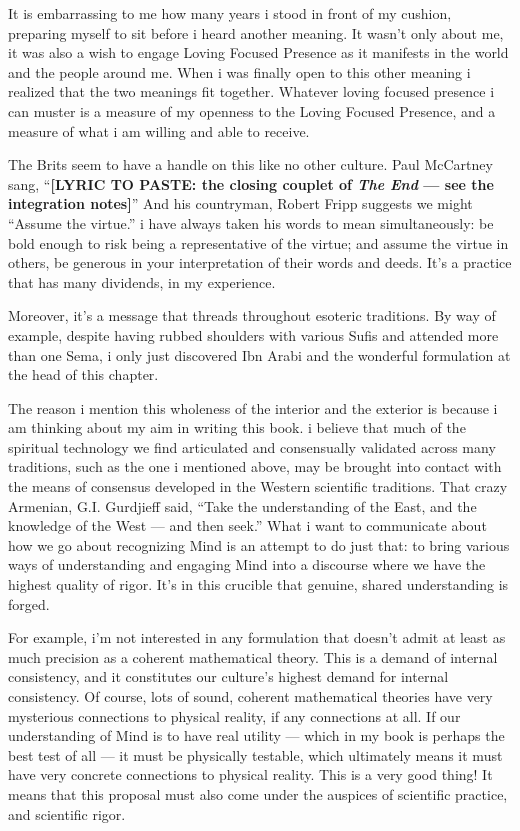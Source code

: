 It is embarrassing to me how many years i stood in front of my cushion, preparing myself to sit before i heard another meaning. It wasn't only about me, it was also a wish to engage Loving Focused Presence as it manifests in the world and the people around me. When i was finally open to this other meaning i realized that the two meanings fit together. Whatever loving focused presence i can muster is a measure of my openness to the Loving Focused Presence, and a measure of what i am willing and able to receive.

The Brits seem to have a handle on this like no other culture. Paul McCartney sang, ``\textbf{[LYRIC TO PASTE: the closing couplet of \emph{The End} --- see the integration notes]}'' And his countryman, Robert Fripp suggests we might ``Assume the virtue.'' i have always taken his words to mean simultaneously: be bold enough to risk being a representative of the virtue; and assume the virtue in others, be generous in your interpretation of their words and deeds. It's a practice that has many dividends, in my experience.

Moreover, it's a message that threads throughout esoteric traditions. By way of example, despite having rubbed shoulders with various Sufis and attended more than one Sema, i only just discovered Ibn Arabi and the wonderful formulation at the head of this chapter.

The reason i mention this wholeness of the interior and the exterior is because i am thinking about my aim in writing this book. i believe that much of the spiritual technology we find articulated and consensually validated across many traditions, such as the one i mentioned above, may be brought into contact with the means of consensus developed in the Western scientific traditions. That crazy Armenian, G.I. Gurdjieff said, ``Take the understanding of the East, and the knowledge of the West --- and then seek.'' What i want to communicate about how we go about recognizing Mind is an attempt to do just that: to bring various ways of understanding and engaging Mind into a discourse where we have the highest quality of rigor. It's in this crucible that genuine, shared understanding is forged.

For example, i'm not interested in any formulation that doesn't admit at least as much precision as a coherent mathematical theory. This is a demand of internal consistency, and it constitutes our culture's highest demand for internal consistency. Of course, lots of sound, coherent mathematical theories have very mysterious connections to physical reality, if any connections at all. If our understanding of Mind is to have real utility --- which in my book is perhaps the best test of all --- it must be physically testable, which ultimately means it must have very concrete connections to physical reality. This is a very good thing! It means that this proposal must also come under the auspices of scientific practice, and scientific rigor.


